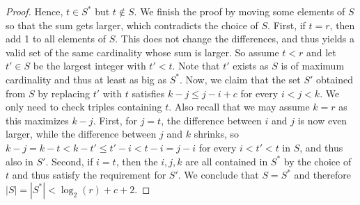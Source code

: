 \begin{proof}
    Hence, $ t \in S^* $ but $ t \notin S $.
%
    We finish the proof by moving some elements of $ S $ so that the sum gets larger, which contradicts the choice of $ S $.
    First, if $ t = r $, then add 1 to all elements of $ S $.
    This does not change the differences, and thus yields a valid set of the same cardinality whose sum is larger.
    So assume $ t < r $ and let $ t' \in S $ be the largest integer with $ t' < t $.
    Note that $ t' $ exists as $ S $ is of maximum cardinality and thus at least as big as $ S^* $.
    Now, we claim that the set $ S' $ obtained from $ S $ by replacing $ t' $ with  $t$ satisfies $ k - j \leq j - i + c $ for every $ i < j < k $.
    We only need to check triples containing $ t $.
    Also recall that we may assume $ k = r $ as this maximizes $ k - j $.
    First, for $ j = t $, the difference between $ i $ and $ j $ is now even larger, while the difference between $ j $ and $ k $ shrinks, so $ k - j = k - t < k - t' \leq t' - i < t - i = j - i $ for every $ i < t' < t$ in $ S $, and thus also in $ S' $.
    Second, if $ i = t $, then the $ i, j, k $ are all contained in $ S^* $ by the choice of $ t $ and thus satisfy the requirement for $ S' $.
    We conclude that $ S = S^* $ and therefore $ |S| = |S^*| < \log_2(r) + c + 2 $.
\end{proof}
%
%
%
